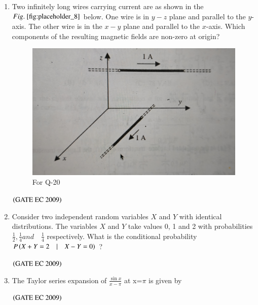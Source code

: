 \documentclass[journal,12pt,onecolumn]{IEEEtran}
\theoremstyle{remark}
\begin{document}
\begin{enumerate}[start=1, label={Q\arabic*.}]
\item Two infinitely long wires carrying current are as shown in the $\figref{fig:placeholder_8}$ below. One wire is in $y-z$ plane and parallel to the $y$-axis. The other wire is in the $x-y$ plane and parallel to the $x$-axis. Which components of the resulting magnetic fields are non-zero at origin?
\begin{figure}[H]
    \centering
    \includegraphics[width=0.5\columnwidth]{figs/fig_8.jpg}
    \caption{\centering For Q-20}
    \label{fig:placeholder_8}
\end{figure}
\begin{enumerate}
\end{enumerate}
\hfill $\left(\text{GATE EC 2009}\right)$
\item Consider two independent random variables $X$ and $Y$ with identical distributions. The variables $X$ and $Y$ take values 0, 1 and 2 with probabilities $\frac{1}{2}, \frac{1}{4} and  \quad \frac{1}{4}$ respectively. What is the conditional probability $P\left(X+Y=2 \quad| \quad X-Y=0\right)$ ?

\begin{enumerate}
\end{enumerate}
\hfill $\left(\text{GATE EC 2009}\right)$

\item The Taylor series expansion of $\frac{\sin x}{x-\pi}$ at x=$\pi$ is given by
\begin{enumerate}
\end{enumerate}
\hfill $\left(\text{GATE EC 2009}\right)$


\end{enumerate}
\end{document}
